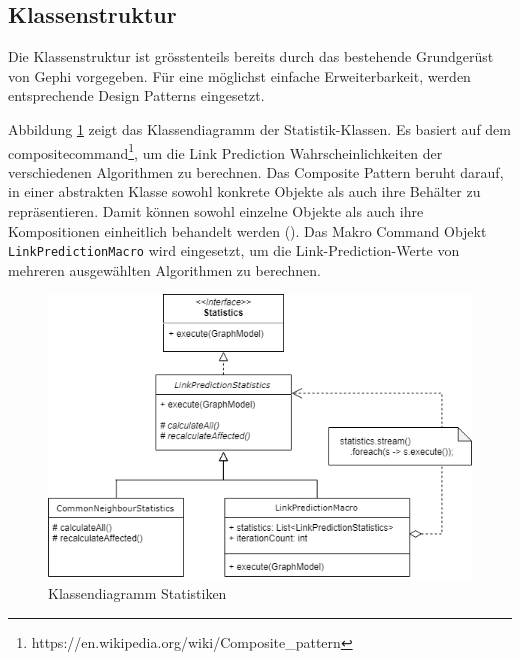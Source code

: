 \subsection{Klassenstruktur}
Die Klassenstruktur ist grösstenteils bereits durch das bestehende Grundgerüst von Gephi vorgegeben. Für eine möglichst einfache Erweiterbarkeit, werden entsprechende Design Patterns eingesetzt.

Abbildung \ref{fig:class_statistic} zeigt das Klassendiagramm der Statistik-Klassen. Es basiert auf dem \acs{compositecommand}\footnote{https://en.wikipedia.org/wiki/Composite\_pattern}, um die Link Prediction Wahrscheinlichkeiten der verschiedenen Algorithmen zu berechnen. Das Composite Pattern beruht darauf, in einer abstrakten Klasse sowohl konkrete Objekte als auch ihre Behälter zu repräsentieren. Damit können sowohl einzelne Objekte als auch ihre Kompositionen einheitlich behandelt werden (\cite{wikipedia_kompositum_2019}). Das Makro Command Objekt \texttt{LinkPredictionMacro} wird eingesetzt, um die Link-Prediction-Werte von mehreren ausgewählten Algorithmen zu berechnen.
\begin{figure}
    \centering
    \includegraphics[width=\linewidth]{resources/class_Statistic.png}
    \caption{Klassendiagramm Statistiken}
    \label{fig:class_statistic}
\end{figure}

